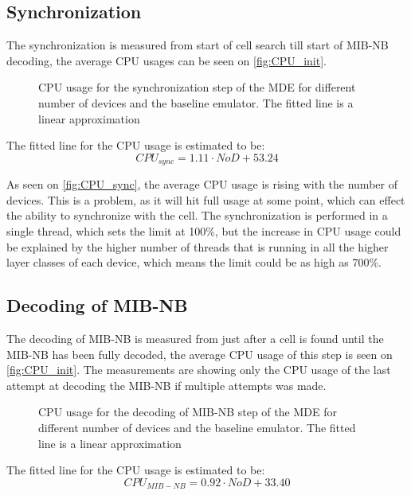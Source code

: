 \subsection{Synchronization}
The synchronization is  measured from start of cell search till start of MIB-NB decoding, the average CPU usages can be seen on \autoref{fig:CPU_init}.

\begin{figure}[H]
\centering
\resizebox{0.5\textwidth}{!}{
}
\caption{CPU usage for the synchronization step of the MDE for different number of devices and the baseline emulator. The fitted line is a linear approximation}
\label{fig:CPU_sync}
\end{figure}

The fitted line for the CPU usage is estimated to be:
\begin{equation}
CPU_{sync} = 1.11 \cdot NoD + 53.24
\end{equation}

As seen on \autoref{fig:CPU_sync}, the average CPU usage is rising with the number of devices. This is a problem, as it will hit full usage at some point, which can effect the ability to synchronize with the cell. The synchronization is performed in a single thread, which sets the limit at 100\%, but the increase in CPU usage could be explained by the higher number of threads that is running in all the higher layer classes of each device, which means the limit could be as high as 700\%. 

\subsection{Decoding of MIB-NB}
The decoding of MIB-NB is measured from just after a cell is found until the MIB-NB has been fully decoded, the average CPU usage of this step is seen on \autoref{fig:CPU_init}. The measurements are showing only the CPU usage of the last attempt at decoding the MIB-NB if multiple attempts was made.

\begin{figure}[H]
\centering
\resizebox{0.5\textwidth}{!}{
}
\caption{CPU usage for the decoding of MIB-NB step of the MDE for different number of devices and the baseline emulator. The fitted line is a linear approximation}
\label{fig:CPU_MIB}
\end{figure}

The fitted line for the CPU usage is estimated to be:
\begin{equation}
CPU_{MIB-NB} = 0.92 \cdot NoD + 33.40
\end{equation}


